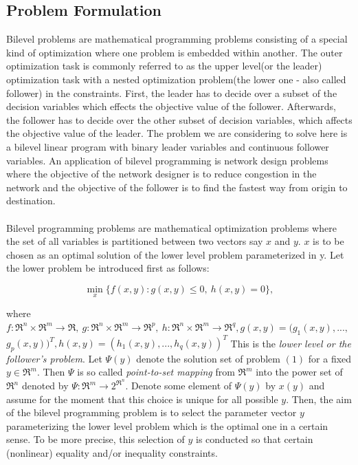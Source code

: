 \documentclass[a4paper, 12pt]{article}
\begin{document}
\subsection{Problem Formulation}
Bilevel problems are mathematical programming problems consisting of a special kind of optimization where one problem is embedded within another. The outer optimization task is commonly referred to as the upper level(or the leader) optimization task with a nested optimization problem(the lower one - also called follower) in the constraints. First, the leader has to decide over a subset of the decision variables which effects the objective value of the follower. Afterwards, the follower has to decide over the other subset of decision variables, which affects the objective value of the leader. The problem we are considering to solve here is a bilevel linear program with binary leader variables and continuous follower variables. An application of bilevel programming is network design problems where the objective of the network designer is to reduce congestion in the network and the objective of the follower is to find the fastest way from origin to destination.\\~\\
\noindent
Bilevel programming problems are mathematical optimization problems where the set of all variables is partitioned between two vectors say $x$ and $y$. $x$ is to be chosen as an optimal solution of the lower level problem parameterized in y. Let the lower problem be introduced first as follows:
\newpage
\begin{large}
\boldmath\begin{equation*}
\min_{x}\{f(x,y):g(x,y)\leq0,\ h(x,y)=0\},
\end{equation*}
\end{large}
where $f:\Re^{n}\times\Re^{m}\rightarrow\Re,\ g:\Re^{n}\times\Re^{m}\rightarrow\Re^{p},\ h:\Re^{n}\times\Re^{m}\rightarrow\Re^{q}, g(x,y)=(g_{1}(x,y),...,$\\
$g_{p}(x,y))^{T}, h(x,y)=(h_{1}(x,y),...,h_{q}(x,y))^{T}$ This is the \textit{lower level or the follower's problem}. Let $\Psi\left(y\right)$ denote the solution set of problem $\left(1\right)$ for a fixed $y\in\Re^{m}$. Then $\Psi$ is so called \textit{point-to-set mapping} from $\Re^{m}$ into the power set of $\Re^{n}$ denoted by $\Psi:\Re^{m}\rightarrow2^{\Re^{n}}$. Denote some element of $\Psi(y)$ by $x\left(y\right)$ and assume for the moment that this choice is unique for all possible $y$. Then, the aim of the bilevel programming problem is to select the parameter vector $y$ parameterizing the lower level problem which is the optimal one in a certain sense. To be more precise, this selection of $y$ is conducted so that certain (nonlinear) equality and/or inequality constraints.\\
\end{document}
